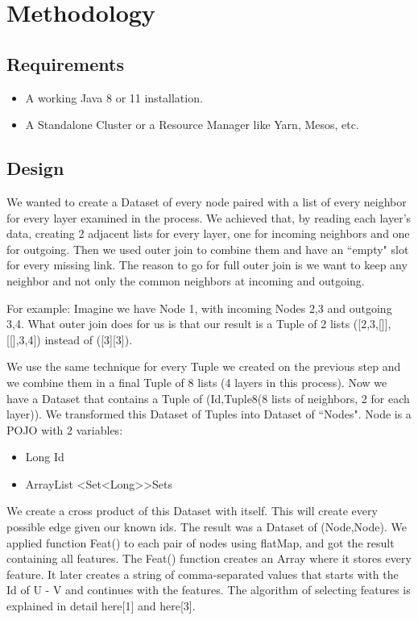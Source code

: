 \chapter{Methodology}



\section{Requirements}



\begin{itemize}
\item A working Java 8 or 11 installation.
\item A Standalone Cluster or a Resource Manager like Yarn, Mesos, etc. 
\end{itemize}
 



\section{Design}
We wanted to create a Dataset of every node paired with a list of every neighbor for every layer examined in the process. We achieved that, by reading each layer's data, creating 2 adjacent lists for every layer, one for incoming neighbors and one for outgoing. Then we used outer join to combine them and have an ``empty" slot for every missing link. The reason to go for full outer join is we want to keep any neighbor and not only the common neighbors at incoming and outgoing.

For example: Imagine we have Node 1, with incoming Nodes 2,3 and outgoing 3,4. What outer join does for us is that our result is a Tuple of 2 lists ([2,3,[]],[[],3,4]) instead of ([3][3]).

We use the same technique for every Tuple we created on the previous step and we combine them in a final Tuple of 8 lists (4 layers in this process).  Now we have a Dataset that contains a Tuple of (Id,Tuple8(8 lists of neighbors, 2 for each layer)). 
We transformed this Dataset of Tuples into Dataset of ``Nodes". Node is a POJO with 2 variables: 
\begin{itemize}
    \item Long Id
    \item ArrayList \textless Set\textless Long\textgreater \textgreater  Sets
\end{itemize}

We create a cross product of this Dataset with itself. This will create every possible edge given our known ids. The result was a Dataset of (Node,Node). We applied function Feat() to each pair of nodes using flatMap, and got the result containing all features. The Feat() function creates an Array where it stores every feature. It later creates a string of comma-separated values that starts with the Id of U - V and continues with the features.  The algorithm of selecting features is explained in detail here[1] and here[3]. 

